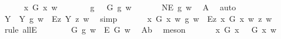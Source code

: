 \begin{isabellebody}
\isanewline
\ \ \ \ \isamarkupfalse%
\ {\isachardoublequoteopen}{\isasymexists}x{\isachardot}\ G\ x\ w{\isachardoublequoteclose}\isanewline
\ \ \ \ \isamarkupfalse%
\ \isamarkupfalse%
\ g\ \ {}{\isacharcolon}\ {\isachardoublequoteopen}G\ g\ w{\isachardoublequoteclose}\ \isacommand{{\isachardot}{\isachardot}}\isamarkupfalse%
\isanewline
\ \ \ \ \isamarkupfalse%
\ {\isachardoublequoteopen}NE\ g\ w{\isachardoublequoteclose}\ \isamarkupfalse%
\ A{}\ \isamarkupfalse%
\ auto\isanewline
\ \ \ \ \isamarkupfalse%
\ {\isachardoublequoteopen}{\isasymforall}Y{\isachardot}\ {\isacharparenleft}{\isasymE}\ Y\ g\ w{\isacharparenright}\ {\isasymlongrightarrow}\ {\isacharparenleft}\isactrlbold {\isasymbox}{\isacharparenleft}\isactrlbold {\isasymexists}\isactrlsup Ez{\isachardot}\ {\isasymlparr}Y\ z{\isasymrparr}{\isacharparenright}{\isacharparenright}\ w{\isachardoublequoteclose}\ \isamarkupfalse%
\ simp\isanewline
\ \ \ \ \isamarkupfalse%
\ {\isachardoublequoteopen}{\isacharparenleft}{\isasymE}\ {\isacharparenleft}{\isasymlambda}x{\isachardot}\ G\ x\ w{\isacharparenright}\ g\ w{\isacharparenright}\ {\isasymlongrightarrow}\ {\isacharparenleft}\isactrlbold {\isasymbox}{\isacharparenleft}\isactrlbold {\isasymexists}\isactrlsup Ez{\isachardot}\ {\isasymlparr}{\isacharparenleft}{\isasymlambda}x{\isachardot}\ G\ x\ w{\isacharparenright}\ z{\isasymrparr}{\isacharparenright}{\isacharparenright}\ w{\isachardoublequoteclose}\ \isamarkupfalse%
\ {\isacharparenleft}rule\ allE{\isacharparenright}\isanewline
\ \ \ \ \isamarkupfalse%
\ {}{\isacharcolon}\ {\isachardoublequoteopen}{\isacharparenleft}{\isacharparenleft}{\isasymE}\ {\isasymdown}G{\isacharparenright}\ g\ w{\isacharparenright}\ {\isasymlongrightarrow}\ {\isacharparenleft}\isactrlbold {\isasymbox}{\isacharparenleft}\isactrlbold {\isasymexists}\isactrlsup E\ G{\isacharparenright}{\isacharparenright}\ w{\isachardoublequoteclose}\ \isamarkupfalse%
\ A{}b\ \isamarkupfalse%
\ meson\isanewline
\ \ \ \ \isamarkupfalse%
\ \ {\isachardoublequoteopen}{\isacharparenleft}\isactrlbold {\isasymforall}x{\isachardot}\ G\ x\ \isactrlbold {\isasymrightarrow}\ {\isacharparenleft}{\isacharparenleft}{\isasymE}\ {\isasymdown}G{\isacharparenright}\ x{\isacharparenright}{\isacharparenright}\ w{\isachardoublequoteclose}\ \isamarkupfalse%

\end{isabellebody}
